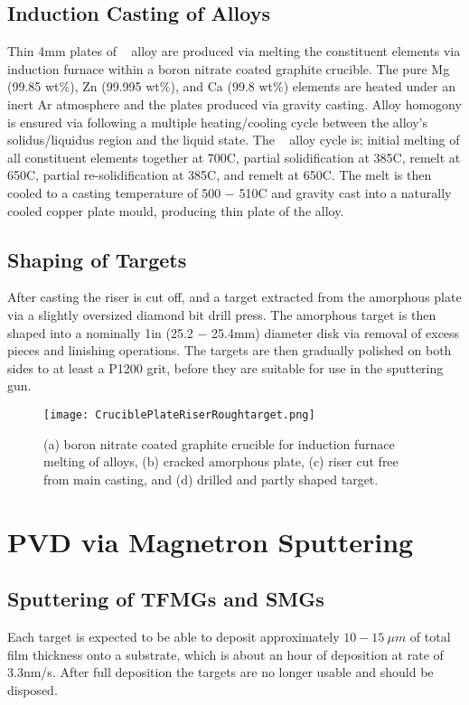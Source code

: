 \documentclass[draft,a4paper,12pt,oneside]{report}%
\begin{document}
\subsection{Induction Casting of Alloys}
Thin 4mm plates  of \MgZnCa~ alloy are produced via melting the constituent elements via induction furnace within a boron nitrate coated graphite crucible. The pure Mg (99.85 wt\%), Zn (99.995 wt\%), and Ca (99.8 wt\%) elements are heated under an inert Ar atmosphere and the plates produced via gravity casting. Alloy homogony is ensured via following a multiple heating/cooling cycle between the alloy's solidus/liquidus region and the liquid state. The \MgZnCa~ alloy cycle is; initial melting of all constituent elements together at 700\degree C, partial solidification at 385\degree C, remelt at 650\degree C, partial re-solidification at 385\degree C, and remelt at 650\degree C. The melt is then cooled to a casting temperature of 500 $-$ 510\degree C and gravity cast into a naturally cooled copper plate mould, producing thin plate of the alloy. 

\subsection{Shaping of Targets}
After casting the riser is cut off, and a target extracted from the amorphous plate via a slightly oversized diamond bit drill press. The amorphous target is then shaped into a nominally 1in (25.2 $-$ 25.4mm) diameter disk via removal of excess pieces and linishing operations. The targets are then gradually polished on both sides to at least a P1200 grit, before they are suitable for use in the sputtering gun. 

\begin{figure}[htbp]
	\centering
	\texttt{[image: CruciblePlateRiserRoughtarget.png]}
	\caption[Target Manufacture]{(a) boron nitrate coated graphite crucible  for induction furnace melting of alloys, (b) cracked amorphous plate, (c) riser cut free from main casting, and (d) drilled and partly shaped target.}
	\label{fig:CrucibleShaping}
\end{figure}

\section{PVD via Magnetron Sputtering}
\subsection{Sputtering of TFMGs and SMGs}
Each target is expected to be able to deposit approximately $10 - 15~ \mu m$ of total film thickness onto a substrate, which is about an hour of deposition at rate of 3.3nm/s. After full deposition the targets are no longer usable and should be disposed. 
\end{document}
